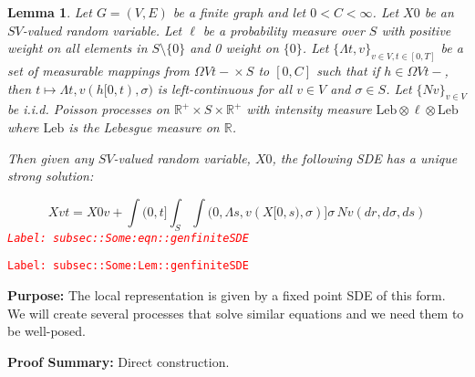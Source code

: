 \documentclass[12pt]{article}
\newcommand{\mb}{\mathbb}
\newcommand{\te}{\text}
\newcommand{\tr}{\textcolor{red}}
\newcommand{\labe}[1]{\tr{\texttt{Label: #1}}}
\newcommand{\purpose}{\textbf{Purpose: }}
\newcommand{\pfsum}{\textbf{Proof Summary: }}
\newcommand{\ind}{\hspace{24pt}}
\renewcommand{\v}{v}							%
\renewcommand{\S}{S}							%
\newcommand{\s}{\sigma}							%
\newcommand{\T}{T}								%
\renewcommand{\t}{t}							%
\renewcommand{\tt}{s}							%
\newcommand{\X}{X}								%
\newcommand{\const}{C}							%
\newcommand{\poiss}{N}							%
\newcommand{\leb}{\te{Leb}}						%
\newcommand{\Sm}{\ell}							%
\renewcommand{\r}{r}							%
\newcommand{\ratee}{\Lambda}					%
\newtheorem{lem}[thms]{Lemma}
\begin{document}
\begin{lem}
Let \(G = (V,E)\) be a finite graph and let \(0 < \const{}< \infty\). Let \(\X{}{0}\) be an \(\S{V}\)-valued random variable. Let \(\Sm\) be a probability measure over \(\S\) with positive weight on all elements in \(\S\setminus\{0\}\) and 0 weight on \(\{0\}\). Let \(\{\ratee{\t,\v}\}_{\v \in V,\t\in [0,\T]}\) be a set of measurable mappings from \(\Omega{V}{\t-} \times \S\) to \([0,\const{}]\) such that if \(h \in \Omega{V}{\t-}\), then \(\t\mapsto \ratee{\t,\v}(h[0,\t),\s)\) is left-continuous for all \(\v \in V\) and \(\s \in \S\). Let \(\{\poiss{\v}\}_{\v \in V}\) be i.i.d. Poisson processes on \(\mb{R}^+\times \S\times\mb{R}^+\) with intensity measure \(\leb\otimes\Sm\otimes\leb\) where \(\leb\) is the Lebesgue measure on \(\mb{R}\).

\ind Then given any \(\S{V}\)-valued random variable, \(\X{}{0}\), the following SDE has a unique strong solution:

\begin{equation}
\X{\v}{\t} = \X{0}{\v} + \int{(0,\t]}\int_\S\int{(0,\ratee{\tt,\v}(\X{}{[0,\tt)},\s)]}  \s\,\poiss{\v}(d\r,d\s,d\tt)
\label{subsec::Some:eqn::genfiniteSDE}
\end{equation}
\labe{subsec::Some:eqn::genfiniteSDE}
\label{subsec::Some:Lem::genfiniteSDE}
\end{lem}
\labe{subsec::Some:Lem::genfiniteSDE}

\purpose The local representation is given by a fixed point SDE of this form. We will create several processes that solve similar equations and we need them to be well-posed.

\pfsum Direct construction.
\end{document}
